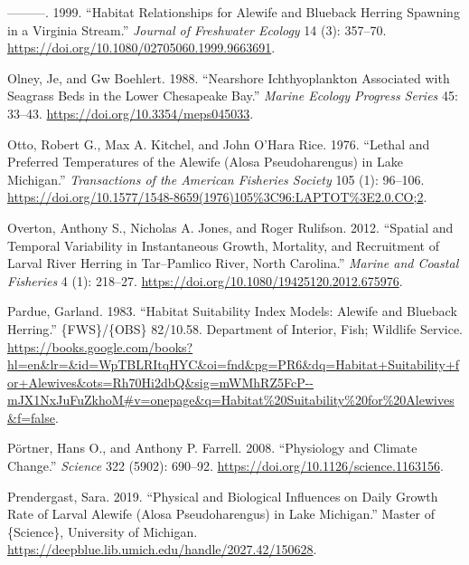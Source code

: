 \documentclass[
]{book}
\newlength{\cslhangindent}
\newlength{\cslentryspacingunit} %
\newenvironment{CSLReferences}[2] %
 {%
  \setlength{\parindent}{0pt}
  \ifodd #1
  \let\oldpar\par
  \def\par{\hangindent=\cslhangindent\oldpar}
  \fi
  \setlength{\parskip}{#2\cslentryspacingunit}
 }%
 {}
\begin{document}
\begin{CSLReferences}{1}{0}
\leavevmode{}%
---------. 1999. {``Habitat {Relationships} for {Alewife} and {Blueback} {Herring} {Spawning} in a {Virginia} {Stream}.''} \emph{Journal of Freshwater Ecology} 14 (3): 357--70. \url{https://doi.org/10.1080/02705060.1999.9663691}.

\leavevmode{}%
Olney, Je, and Gw Boehlert. 1988. {``Nearshore Ichthyoplankton Associated with Seagrass Beds in the Lower {Chesapeake} {Bay}.''} \emph{Marine Ecology Progress Series} 45: 33--43. \url{https://doi.org/10.3354/meps045033}.

\leavevmode{}%
Otto, Robert G., Max A. Kitchel, and John O'Hara Rice. 1976. {``Lethal and {Preferred} {Temperatures} of the {Alewife} ({Alosa} Pseudoharengus) in {Lake} {Michigan}.''} \emph{Transactions of the American Fisheries Society} 105 (1): 96--106. \url{https://doi.org/10.1577/1548-8659(1976)105\%3C96:LAPTOT\%3E2.0.CO;2}.

\leavevmode{}%
Overton, Anthony S., Nicholas A. Jones, and Roger Rulifson. 2012. {``Spatial and {Temporal} {Variability} in {Instantaneous} {Growth}, {Mortality}, and {Recruitment} of {Larval} {River} {Herring} in {Tar}--{Pamlico} {River}, {North} {Carolina}.''} \emph{Marine and Coastal Fisheries} 4 (1): 218--27. \url{https://doi.org/10.1080/19425120.2012.675976}.

\leavevmode{}%
Pardue, Garland. 1983. {``Habitat {Suitability} {Index} {Models}: {Alewife} and {Blueback} {Herring}.''} \{FWS\}/\{OBS\} 82/10.58. Department of Interior, Fish; Wildlife Service. \url{https://books.google.com/books?hl=en\&lr=\&id=WpTBLRItqHYC\&oi=fnd\&pg=PR6\&dq=Habitat+Suitability+for+Alewives\&ots=Rh70Hi2dbQ\&sig=mWMhRZ5FcP--mJX1NxJuFuZkhoM\#v=onepage\&q=Habitat\%20Suitability\%20for\%20Alewives\&f=false}.

\leavevmode{}%
Pörtner, Hans O., and Anthony P. Farrell. 2008. {``Physiology and {Climate} {Change}.''} \emph{Science} 322 (5902): 690--92. \url{https://doi.org/10.1126/science.1163156}.

\leavevmode{}%
Prendergast, Sara. 2019. {``Physical and Biological Influences on Daily Growth Rate of Larval Alewife ({Alosa} Pseudoharengus) in {Lake} {Michigan}.''} Master of \{Science\}, University of Michigan. \url{https://deepblue.lib.umich.edu/handle/2027.42/150628}.


\end{CSLReferences}
\end{document}
